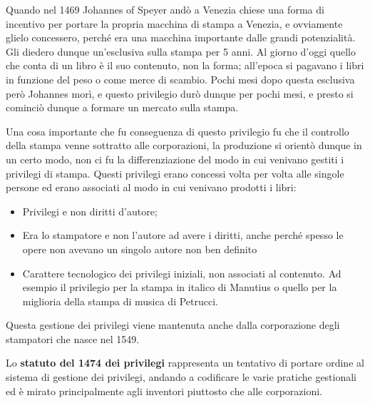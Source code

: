 Quando nel 1469 Johannes of Speyer andò a Venezia chiese una forma di incentivo per portare la propria macchina di stampa a Venezia, e ovviamente glielo concessero, perché era una macchina importante dalle grandi potenzialità. Gli diedero dunque un'esclusiva sulla stampa per 5 anni. 
Al giorno d'oggi quello che conta di un libro è il suo contenuto, non la forma; all'epoca si pagavano i libri in funzione del peso o come merce di scambio. Pochi mesi dopo questa esclusiva però Johannes morì, e questo privilegio durò dunque per pochi mesi, e presto si cominciò dunque a formare un mercato sulla stampa. 

Una cosa importante che fu conseguenza di questo privilegio fu che il controllo della stampa venne sottratto alle corporazioni, la produzione si orientò dunque in un certo modo, non ci fu la differenziazione del modo in cui venivano gestiti i privilegi di stampa. Questi privilegi erano concessi volta per volta alle singole persone ed erano associati al modo in cui venivano prodotti i libri:

\begin{itemize}

\item Privilegi e non diritti d'autore; 
\item Era lo stampatore e non l'autore ad avere i diritti, anche perché spesso le opere non avevano un singolo autore non ben definito
\item Carattere tecnologico dei privilegi iniziali, non associati al contenuto. Ad esempio il privilegio per la stampa in italico di Manutius o quello per la miglioria della stampa di musica di Petrucci.

\end{itemize}

Questa gestione dei privilegi viene mantenuta anche dalla corporazione degli stampatori che nasce nel 1549.

Lo \textbf{statuto del 1474 dei privilegi} rappresenta un tentativo di portare ordine al sistema di gestione dei privilegi, andando a codificare le varie pratiche gestionali ed è mirato principalmente agli inventori piuttosto che alle corporazioni.



